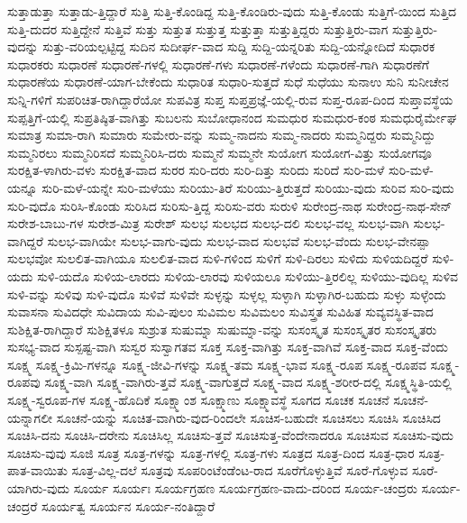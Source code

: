 {ಸುತ್ತಾಡುತ್ತಾ
ಸುತ್ತಾಡು-ತ್ತಿದ್ದಾರೆ
ಸುತ್ತಿ
ಸುತ್ತಿ-ಕೊಂಡಿದ್ದ
ಸುತ್ತಿ-ಕೊಂಡಿರು-ವುದು
ಸುತ್ತಿ-ಕೊಂಡು
ಸುತ್ತಿಗೆ-ಯಿಂದ
ಸುತ್ತಿದ
ಸುತ್ತಿ-ದುದರ
ಸುತ್ತಿದ್ದೇನೆ
ಸುತ್ತಿವೆ
ಸುತ್ತು
ಸುತ್ತುತ
ಸುತ್ತುತ್ತ
ಸುತ್ತುತ್ತಾ
ಸುತ್ತುತ್ತಿದ್ದರು
ಸುತ್ತುತ್ತಿರು-ವಾಗ
ಸುತ್ತುತ್ತಿರು-ವುದನ್ನು
ಸುತ್ತು-ವರಿಯಲ್ಪಟ್ಟಿದ್ದ
ಸುದಿನ
ಸುದೀರ್ಘ-ವಾದ
ಸುದ್ದಿ
ಸುದ್ದಿ-ಯನ್ನರಿತು
ಸುದ್ದಿ-ಯನ್ನೋದಿದೆ
ಸುಧಾರಕ
ಸುಧಾರಕರು
ಸುಧಾರಣೆ
ಸುಧಾರಣೆ-ಗಳಲ್ಲಿ
ಸುಧಾರಣೆ-ಗಳು
ಸುಧಾರಣೆ-ಗಳೆಂದು
ಸುಧಾರಣೆ-ಗಾಗಿ
ಸುಧಾರಣೆಗೆ
ಸುಧಾರಣೆಯ
ಸುಧಾರಣೆ-ಯಾಗ-ಬೇಕೆಂದು
ಸುಧಾರಿತ
ಸುಧಾರಿ-ಸುತ್ತದೆ
ಸುಧೆ
ಸುಧೆಯು
ಸುನಾಉ
ಸುನಿ
ಸುನೀಚೇನ
ಸುನ್ನಿ-ಗಳಿಗೆ
ಸುಪರಿಚಿತ-ರಾಗಿದ್ದಾರೆಯೋ
ಸುಪವಿತ್ರ
ಸುಪ್ತ
ಸುಪ್ತಪ್ರಜ್ಞೆ-ಯಲ್ಲಿ-ರುವ
ಸುಪ್ತ-ರೂಪ-ದಿಂದ
ಸುಪ್ತಾವಸ್ಥೆಯ
ಸುಪ್ಪತ್ತಿಗೆ-ಯಲ್ಲಿ
ಸುಪ್ರತಿಷ್ಠಿತ-ವಾಗಿತ್ತು
ಸುಬಲನು
ಸುಬೋಧಾನಂದ
ಸುಮಧುರ
ಸುಮಧುರ-ಕಂಠ
ಸುಮಧುರೈರ್ಮೇಘ
ಸುಮಾತ್ರ
ಸುಮಾ-ರಾಗಿ
ಸುಮಾರು
ಸುಮೇರು-ವನ್ನು
ಸುಮ್ಮ-ನಾದನು
ಸುಮ್ಮ-ನಾದರು
ಸುಮ್ಮನಿದ್ದರು
ಸುಮ್ಮನಿದ್ದು
ಸುಮ್ಮನಿರಲು
ಸುಮ್ಮನಿರಿಸದೆ
ಸುಮ್ಮನಿರಿಸಿ-ದರು
ಸುಮ್ಮನೆ
ಸುಮ್ಮನೇ
ಸುಯೋಗ
ಸುಯೋಗ-ವಿತ್ತು
ಸುಯೋಗವೂ
ಸುರಕ್ಷಿತ-ಳಾಗಿರು-ವಳು
ಸುರಕ್ಷಿತ-ವಾದ
ಸುರರ
ಸುರಿ-ದರು
ಸುರಿ-ದಿತ್ತು
ಸುರಿದು
ಸುರಿದೆ
ಸುರಿ-ಮಳೆ
ಸುರಿ-ಮಳೆ-ಯನ್ನೂ
ಸುರಿ-ಮಳೆ-ಯನ್ನೇ
ಸುರಿ-ಮಳೆಯು
ಸುರಿಯು-ತಿರೆ
ಸುರಿಯು-ತ್ತಿರುತ್ತದೆ
ಸುರಿಯು-ವುದು
ಸುರಿವ
ಸುರಿ-ವುದು
ಸುರಿ-ವುದೊ
ಸುರಿಸಿ-ಕೊಂಡು
ಸುರಿಸಿದ
ಸುರಿಸು-ತ್ತಿದ್ದ
ಸುರಿಸು-ವರು
ಸುರುಳಿ
ಸುರೇಂದ್ರ-ನಾಥ
ಸುರೇಂದ್ರ-ನಾಥ-ಸೇನ್
ಸುರೇಶ-ಬಾಬು-ಗಳ
ಸುರೇಶ-ಮಿತ್ರ
ಸುರೇಶ್
ಸುಲಭ
ಸುಲಭದ
ಸುಲಭ-ದಲಿ
ಸುಲಭ-ವಲ್ಲ
ಸುಲಭ-ವಾಗಿ
ಸುಲಭ-ವಾಗಿದ್ದರೆ
ಸುಲಭ-ವಾಗಿಯೇ
ಸುಲಭ-ವಾಗು-ವುದು
ಸುಲಭ-ವಾದ
ಸುಲಭವೆ
ಸುಲಭ-ವೆಂದು
ಸುಲಭ-ವೇನಪ್ಪಾ
ಸುಲಭವೋ
ಸುಲಲಿತ-ವಾಗಿಯೂ
ಸುಲಲಿತ-ವಾದ
ಸುಳಿ-ಗಳಿಂದ
ಸುಳಿಗೆ
ಸುಳಿ-ದಿರಲು
ಸುಳಿದು
ಸುಳಿಯದಿದ್ದರೆ
ಸುಳಿ-ಯದು
ಸುಳಿ-ಯದೊ
ಸುಳಿಯ-ಲಾರದು
ಸುಳಿಯ-ಲಾರವು
ಸುಳಿಯಲೂ
ಸುಳಿಯು-ತ್ತಿರಲಿಲ್ಲ
ಸುಳಿಯು-ವುದಿಲ್ಲ
ಸುಳಿವ
ಸುಳಿ-ವನ್ನು
ಸುಳಿವು
ಸುಳಿ-ವುದೊ
ಸುಳಿವೆ
ಸುಳಿವೇ
ಸುಳ್ಳನ್ನು
ಸುಳ್ಳಲ್ಲ
ಸುಳ್ಳಾಗಿ
ಸುಳ್ಳಾಗಿರ-ಬಹುದು
ಸುಳ್ಳು
ಸುಳ್ಳೆಂದು
ಸುವಾಸನಾ
ಸುವಿದಧೇ
ಸುವಿದಾಯ
ಸುವಿ-ಪುಲಂ
ಸುವಿಮಲ
ಸುವಿಮಲಂ
ಸುವಿಸ್ತ್ರತ
ಸುವಿಹಿತ
ಸುವ್ಯವಸ್ಥಿತ-ವಾದ
ಸುಶಿಕ್ಷಿತ-ರಾಗಿದ್ದಾರೆ
ಸುಶಿಕ್ಷಿತಳೂ
ಸುಶ್ರುತ
ಸುಷುಮ್ನಾ
ಸುಷುಮ್ನಾ-ವನ್ನು
ಸುಸಂಸ್ಕೃತ
ಸುಸಂಸ್ಕೃತರ
ಸುಸಂಸ್ಕೃತರು
ಸುಸಭ್ಯ-ವಾದ
ಸುಸ್ಪಷ್ಟ-ವಾಗಿ
ಸುಸ್ವರ
ಸುಸ್ವಾಗತವ
ಸೂಕ್ತ
ಸೂಕ್ತ-ವಾಗಿತ್ತು
ಸೂಕ್ತ-ವಾಗಿವೆ
ಸೂಕ್ತ-ವಾದ
ಸೂಕ್ತ-ವೆಂದು
ಸೂಕ್ಷ್ಮ
ಸೂಕ್ಷ್ಮ-ಕ್ರಿಮಿ-ಗಳನ್ನೂ
ಸೂಕ್ಷ್ಮ-ಜೀವಿ-ಗಳನ್ನು
ಸೂಕ್ಷ್ಮ-ತಮ
ಸೂಕ್ಷ್ಮ-ಭಾವ
ಸೂಕ್ಷ್ಮ-ರೂಪ
ಸೂಕ್ಷ್ಮ-ರೂಪವ
ಸೂಕ್ಷ್ಮ-ರೂಪವು
ಸೂಕ್ಷ್ಮ-ವಾಗಿ
ಸೂಕ್ಷ್ಮ-ವಾಗಿರು-ತ್ತವೆ
ಸೂಕ್ಷ್ಮ-ವಾಗುತ್ತದೆ
ಸೂಕ್ಷ್ಮ-ವಾದ
ಸೂಕ್ಷ್ಮ-ಶರೀರ-ದಲ್ಲಿ
ಸೂಕ್ಷ್ಮಸ್ಥಿತಿ-ಯಲ್ಲಿ
ಸೂಕ್ಷ್ಮ-ಸ್ವರೂಪ-ಗಳ
ಸೂಕ್ಷ್ಮ-ಹೊದಿಕೆ
ಸೂಕ್ಷ್ಮಾಂಶ
ಸೂಕ್ಷ್ಮಾಣು
ಸೂಕ್ಷ್ಮಾವಸ್ಥೆ
ಸೂಗದ
ಸೂಚಕ
ಸೂಚನೆ
ಸೂಚನೆ-ಯನ್ನಾಗಲೀ
ಸೂಚನೆ-ಯನ್ನು
ಸೂಚಿತ-ವಾಗಿರು-ವುದ-ರಿಂದಲೇ
ಸೂಚಿಸ-ಬಹುದೇ
ಸೂಚಿಸಲು
ಸೂಚಿಸಿ
ಸೂಚಿಸಿದ
ಸೂಚಿಸಿ-ದನು
ಸೂಚಿಸಿ-ದರೇನು
ಸೂಚಿಸಿಲ್ಲ
ಸೂಚಿಸು-ತ್ತವೆ
ಸೂಚಿಸುತ್ತ-ವೆಂದೇನಾದರೂ
ಸೂಚಿಸುವ
ಸೂಚಿಸು-ವುದು
ಸೂಚಿಸು-ವುವು
ಸೂಜಿ
ಸೂತ್ರ
ಸೂತ್ರ-ಗಳನ್ನು
ಸೂತ್ರ-ಗಳಲ್ಲಿ
ಸೂತ್ರ-ಗಳು
ಸೂತ್ರದ
ಸೂತ್ರ-ದಿಂದ
ಸೂತ್ರ-ಧಾರ
ಸೂತ್ರ-ಪಾತ-ವಾಯಿತು
ಸೂತ್ರ-ವಿಲ್ಲ-ದಲೆ
ಸೂತ್ರವು
ಸೂಪರಿಂಟೆಂಡೆಂಟ-ರಾದ
ಸೂರೆಗೊಳ್ಳುತ್ತಿವೆ
ಸೂರೆ-ಗೊಳ್ಳುವ
ಸೂರೆ-ಯಾಗಿರು-ವುದು
ಸೂರ್ಯ
ಸೂರ್ಯಃ
ಸೂರ್ಯಗ್ರಹಣ
ಸೂರ್ಯಗ್ರಹಣ-ವಾದು-ದರಿಂದ
ಸೂರ್ಯ-ಚಂದ್ರರು
ಸೂರ್ಯ-ಚಂದ್ರರೆ
ಸೂರ್ಯತ್ವ
ಸೂರ್ಯನ
ಸೂರ್ಯ-ನಂತಿದ್ದಾರೆ
}
